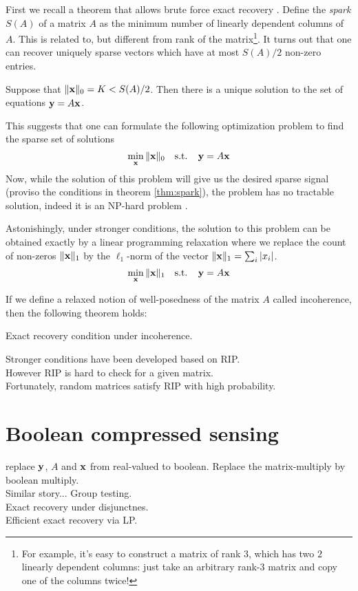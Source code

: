 First we recall a theorem that allows brute force exact recovery \cite{Donoho}. Define the {\em spark} 
$S(A)$ of a matrix $A$ as the minimum number of linearly dependent columns of $A$. This is related to, 
but different from rank of the matrix\footnote{For example, it's easy to construct a matrix of rank 
$3$, which has two $2$ linearly dependent columns: just take an arbitrary rank-$3$ matrix and 
copy one of the columns twice!}. It turns out that one can recover uniquely sparse vectors which 
have at most $S(A) / 2$ non-zero entries. 
 
\begin{theorem}
\label{thm:spark}
Suppose that $\Vert \mathbf{x} \Vert_0 = K < S(A) / 2$. Then there is a unique solution to the 
set of equations $\mathbf{y} = A \mathbf{x}$. 
\end{theorem}

This suggests that one can formulate the following optimization problem to find the sparse set of solutions
\begin{equation}
\min_{\mathbf{x}} \Vert \mathbf{x} \Vert_0  ~~\mbox{ s.t. }~~ \mathbf{y} = A \mathbf{x}
\end{equation}
Now, while the solution of this problem will give us the desired sparse signal (proviso the conditions in 
theorem \ref{thm:spark}), the problem has no tractable solution, indeed it is an NP-hard problem \cite{complexity_sparse_rec}. 

Astonishingly, under stronger conditions, the solution to this problem can be obtained exactly by a linear
programming relaxation where we replace the count of non-zeros $\Vert \mathbf{x} \Vert_1$  by the $\ell_1$-norm
of the vector $\Vert \mathbf{x} \Vert_1 = \sum_i | x_i|$. 
\begin{equation}
\min_{\mathbf{x}} \Vert \mathbf{x} \Vert_1  ~~\mbox{ s.t. }~~ \mathbf{y} = A \mathbf{x}
\end{equation}

If we define a relaxed notion of well-posedness of the matrix $A$ called incoherence, then the following
theorem holds:
\begin{theorem}
\label{thm:spark}
Exact recovery condition under incoherence. 
\end{theorem}

Stronger conditions have been developed based on RIP. \\

However RIP is hard to check for a given matrix.\\

Fortunately, random matrices satisfy RIP with high probability. \\


\section{ Boolean compressed sensing}

replace $\mathbf{y}$, $A$ and $\mathbf{x}$ from real-valued to boolean. 
Replace the matrix-multiply by boolean multiply. \\

Similar story... Group testing.\\

Exact recovery under disjunctnes.\\

Efficient exact recovery via LP.\\








